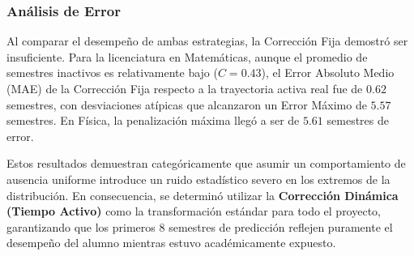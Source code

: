 \subsubsection{Análisis de Error}
Al comparar el desempeño de ambas estrategias, la Corrección Fija demostró ser insuficiente. Para la licenciatura en Matemáticas, aunque el promedio de semestres inactivos es relativamente bajo ($C=0.43$), el Error Absoluto Medio (MAE) de la Corrección Fija respecto a la trayectoria activa real fue de $0.62$ semestres, con desviaciones atípicas que alcanzaron un Error Máximo de $5.57$ semestres. En Física, la penalización máxima llegó a ser de $5.61$ semestres de error.

Estos resultados demuestran categóricamente que asumir un comportamiento de ausencia uniforme introduce un ruido estadístico severo en los extremos de la distribución. En consecuencia, se determinó utilizar la \textbf{Corrección Dinámica (Tiempo Activo)} como la transformación estándar para todo el proyecto, garantizando que los primeros 8 semestres de predicción reflejen puramente el desempeño del alumno mientras estuvo académicamente expuesto.
